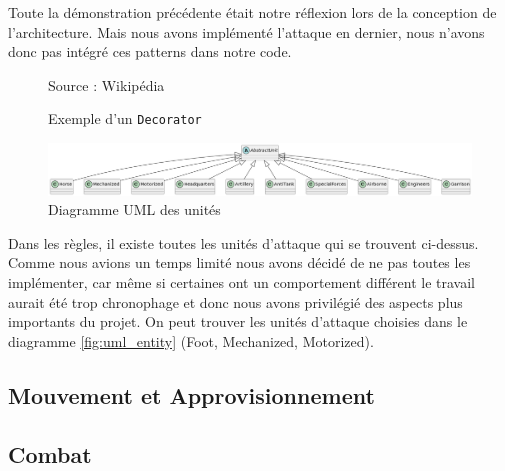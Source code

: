 Toute la démonstration précédente était notre réflexion lors de la conception de l'architecture. Mais nous avons implémenté l'attaque en dernier, nous n'avons donc pas intégré ces patterns dans notre code.

\begin{figure}[H]
    \centering
    \def\stackalignment{r}
    {\scriptsize%
        Source : Wikipédia}
    \caption{Exemple d'un {\tt Decorator}}
    \label{fig:UML_Decorator_Pattern_Example}
\end{figure}


\begin{figure}[H]
    \centering
    \includegraphics[scale=0.3]{data/uml_abstract_unit.png}
    \caption{Diagramme UML des unités}
    \label{fig:uml_abstract_unit}
\end{figure}

Dans les règles, il existe toutes les unités d'attaque qui se trouvent ci-dessus. Comme nous avions un temps limité nous avons décidé de ne pas toutes les implémenter, car même si certaines ont un comportement différent le travail aurait été trop chronophage et donc nous avons privilégié des aspects plus importants du projet. On peut trouver les unités d'attaque choisies dans le diagramme \ref{fig:uml_entity} (Foot, Mechanized, Motorized).

\subsection{Mouvement et Approvisionnement}



\subsection{Combat}

